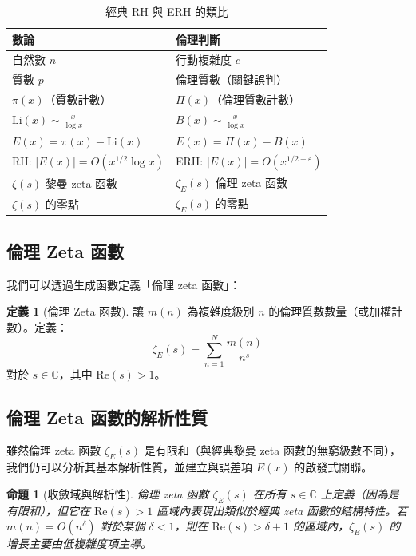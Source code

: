 \documentclass[12pt,a4paper]{article}
\newtheorem{proposition}[theorem]{命題}
\theoremstyle{definition}
\newtheorem{definition}[theorem]{定義}
\theoremstyle{remark}
\begin{document}
\begin{table}[htbp]
\centering
\caption{經典 RH 與 ERH 的類比}
\label{tab:analogy}
\begin{tabular}{ll}
\toprule
\textbf{數論} & \textbf{倫理判斷} \\
\midrule
自然數 $n$ & 行動複雜度 $c$ \\
質數 $p$ & 倫理質數（關鍵誤判） \\
$\pi(x)$（質數計數） & $\Pi(x)$（倫理質數計數） \\
$\text{Li}(x) \sim \frac{x}{\log x}$ & $B(x) \sim \frac{x}{\log x}$ \\
$E(x) = \pi(x) - \text{Li}(x)$ & $E(x) = \Pi(x) - B(x)$ \\
RH: $|E(x)| = O(x^{1/2} \log x)$ & ERH: $|E(x)| = O(x^{1/2 + \varepsilon})$ \\
$\zeta(s)$ 黎曼 zeta 函數 & $\zeta_E(s)$ 倫理 zeta 函數 \\
$\zeta(s)$ 的零點 & $\zeta_E(s)$ 的零點 \\
\bottomrule
\end{tabular}
\end{table}

\subsection{倫理 Zeta 函數}

我們可以透過生成函數定義「倫理 zeta 函數」：

\begin{definition}[倫理 Zeta 函數]
讓 $m(n)$ 為複雜度級別 $n$ 的倫理質數數量（或加權計數）。定義：
\[
\zeta_E(s) = \sum_{n=1}^{N} \frac{m(n)}{n^s}
\]
對於 $s \in \mathbb{C}$，其中 $\text{Re}(s) > 1$。
\end{definition}

\subsection{倫理 Zeta 函數的解析性質}

雖然倫理 zeta 函數 $\zeta_E(s)$ 是有限和（與經典黎曼 zeta 函數的無窮級數不同），我們仍可以分析其基本解析性質，並建立與誤差項 $E(x)$ 的啟發式關聯。

\begin{proposition}[收斂域與解析性]
\label{prop:zeta_convergence}
倫理 zeta 函數 $\zeta_E(s)$ 在所有 $s \in \mathbb{C}$ 上定義（因為是有限和），但它在 $\text{Re}(s) > 1$ 區域內表現出類似於經典 zeta 函數的結構特性。若 $m(n) = O(n^\delta)$ 對於某個 $\delta < 1$，則在 $\text{Re}(s) > \delta + 1$ 的區域內，$\zeta_E(s)$ 的增長主要由低複雜度項主導。
\end{proposition}
\end{document}
